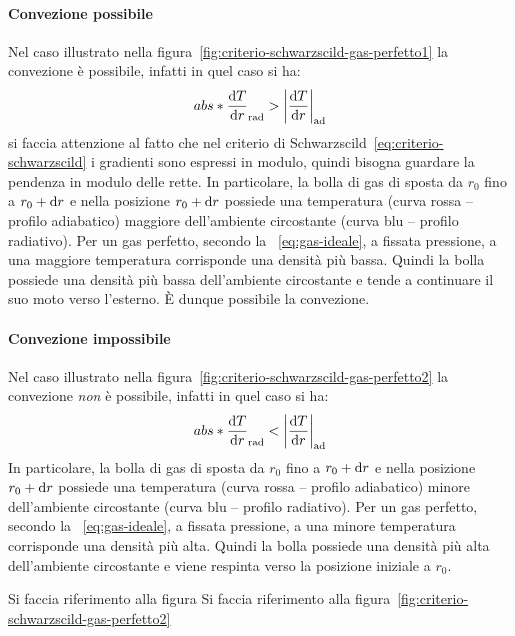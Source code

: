 \paragraph{Convezione possibile}
Nel caso illustrato nella figura~\ref{fig:criterio-schwarzscild-gas-perfetto1} la convezione è possibile, infatti in quel caso si ha:
\[
abs*{\dfrac{\ud T}{\ud r}}_\textup{rad} > \abs*{\dfrac{\ud T}{\ud r}}_\textup{ad}
\]
si faccia attenzione al fatto che nel criterio di Schwarzscild~\eqref{eq:criterio-schwarzscild} i gradienti sono espressi in modulo, quindi bisogna guardare la pendenza in modulo delle rette. In particolare, la bolla di gas di sposta da $r_0$ fino a $r_0 + \ud r$ e nella posizione $r_0 + \ud r$ possiede una temperatura (curva rossa -- profilo adiabatico) maggiore dell'ambiente circostante (curva blu -- profilo radiativo). Per un gas perfetto, secondo la ~\eqref{eq:gas-ideale}, a fissata pressione, a una maggiore temperatura corrisponde una densità più bassa. Quindi la bolla possiede una densità più bassa dell'ambiente circostante e tende a continuare il suo moto verso l'esterno. È dunque possibile la convezione.

\paragraph{Convezione impossibile}
Nel caso illustrato nella figura~\ref{fig:criterio-schwarzscild-gas-perfetto2} la convezione \emph{non} è possibile, infatti in quel caso si ha:
\[
abs*{\dfrac{\ud T}{\ud r}}_\textup{rad} < \abs*{\dfrac{\ud T}{\ud r}}_\textup{ad}
\]
In particolare, la bolla di gas di sposta da $r_0$ fino a $r_0 + \ud r$ e nella posizione $r_0 + \ud r$ possiede una temperatura (curva rossa -- profilo adiabatico) minore dell'ambiente circostante (curva blu -- profilo radiativo). Per un gas perfetto, secondo la ~\eqref{eq:gas-ideale}, a fissata pressione, a una minore temperatura corrisponde una densità più alta. Quindi la bolla possiede una densità più alta dell'ambiente circostante e viene respinta verso la posizione iniziale a $r_0$.


Si faccia riferimento alla figura
Si faccia riferimento alla figura~\ref{fig:criterio-schwarzscild-gas-perfetto2}

